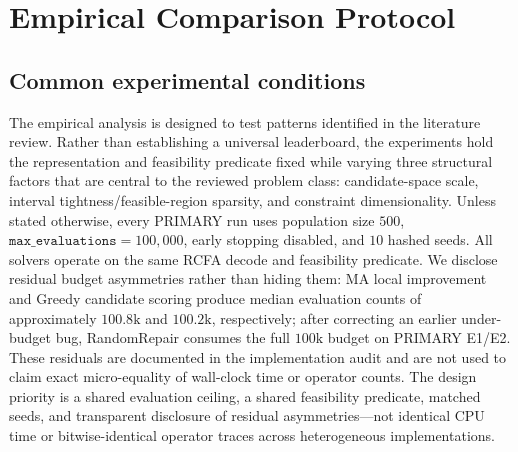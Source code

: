 \documentclass[lettersize,journal]{IEEEtran}
\begin{document}
\section{Empirical Comparison Protocol}
\label{sec:bench}

\subsection{Common experimental conditions}
The empirical analysis is designed to test patterns identified in the literature review.
Rather than establishing a universal leaderboard, the experiments hold the representation and feasibility predicate fixed while varying three structural factors that are central to the reviewed problem class: candidate-space scale, interval tightness/feasible-region sparsity, and constraint dimensionality.
Unless stated otherwise, every PRIMARY run uses population size $500$, $\texttt{max\_evaluations}=100{,}000$, early stopping disabled, and $10$ hashed seeds.
All solvers operate on the same RCFA decode and feasibility predicate.
We disclose residual budget asymmetries rather than hiding them: MA local improvement and Greedy candidate scoring produce median evaluation counts of approximately $100.8\mathrm{k}$ and $100.2\mathrm{k}$, respectively; after correcting an earlier under-budget bug, RandomRepair consumes the full $100\mathrm{k}$ budget on PRIMARY E1/E2.
These residuals are documented in the implementation audit and are not used to claim exact micro-equality of wall-clock time or operator counts.
The design priority is a shared evaluation ceiling, a shared feasibility predicate, matched seeds, and transparent disclosure of residual asymmetries---not identical CPU time or bitwise-identical operator traces across heterogeneous implementations.
\end{document}
